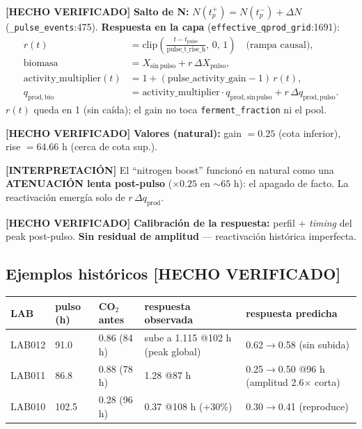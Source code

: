 \documentclass[11pt,a4paper]{article}
\newcommand{\hecho}{\textcolor{hecho}{\textbf{[HECHO VERIFICADO]}}}
\newcommand{\interp}{\textcolor{interp}{\textbf{[INTERPRETACI\'ON]}}}
\newcommand{\ruta}[1]{\texttt{\small #1}}
\begin{document}
\hecho{} \textbf{Salto de N:} $N(t_p^+) = N(t_p^-) + \Delta N$ (\ruta{\_pulse\_events}:475). \textbf{Respuesta en la capa} (\ruta{effective\_qprod\_grid}:1691):
\begin{align}
r(t) &= \mathrm{clip}\!\left(\tfrac{t - t_{\mathrm{pulse}}}{\text{pulse\_t\_rise\_h}},\,0,\,1\right) \quad\text{(rampa causal)},\\
\text{biomasa} &= X_{\mathrm{sin\,pulso}} + r\,\Delta X_{\mathrm{pulso}},\\
\text{activity\_multiplier}(t) &= 1 + (\text{pulse\_activity\_gain} - 1)\, r(t),\\
q_{\mathrm{prod,bio}} &= \text{activity\_multiplier}\cdot q_{\mathrm{prod,sin\,pulso}} + r\,\Delta q_{\mathrm{prod,pulso}}.
\end{align}
$r(t)$ queda en 1 (sin ca\'ida); el gain no toca \ruta{ferment\_fraction} ni el pool.

\hecho{} \textbf{Valores (natural):} gain $=0.25$ (cota inferior), rise $=64.66$ h (cerca de cota sup.).

\interp{} El ``nitrogen boost'' funcion\'o en natural como una \textbf{ATENUACI\'ON lenta post-pulso} ($\times 0.25$ en ${\sim}65$ h): el apagado de facto. La reactivaci\'on emerg\'ia solo de $r\,\Delta q_{\mathrm{prod}}$.

\hecho{} \textbf{Calibraci\'on de la respuesta:} perfil + \emph{timing} del peak post-pulso. \textbf{Sin residual de amplitud} --- reactivaci\'on hist\'orica imperfecta.

\subsection{Ejemplos hist\'oricos \hecho}
\begin{table}[h]\centering\small
\begin{tabularx}{\textwidth}{P{1.2cm}P{1.5cm}P{2.2cm}L L}
\toprule
LAB & pulso (h) & CO$_2$ antes & respuesta observada & respuesta predicha \\
\midrule
LAB012 & 91.0 & 0.86 (84 h) & sube a 1.115 @102 h (peak global) & 0.62$\to$0.58 (sin subida) \\
LAB011 & 86.8 & 0.88 (78 h) & 1.28 @87 h & 0.25$\to$0.50 @96 h (amplitud 2.6$\times$ corta) \\
LAB010 & 102.5 & 0.28 (96 h) & 0.37 @108 h (+30\%) & 0.30$\to$0.41 (reproduce) \\
\bottomrule
\end{tabularx}
\end{table}
\end{document}
